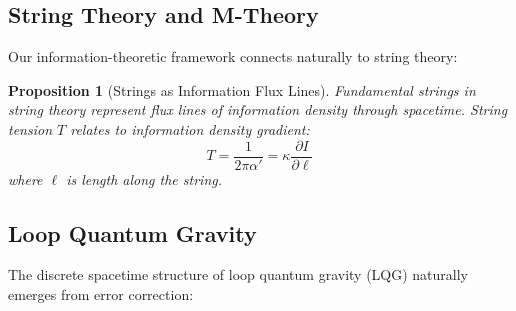 \documentclass[12pt,a4paper]{article}
\newtheorem{proposition}[theorem]{Proposition}
\theoremstyle{remark}
\begin{document}
\subsection{String Theory and M-Theory}

Our information-theoretic framework connects naturally to string theory:

\begin{proposition}[Strings as Information Flux Lines]
Fundamental strings in string theory represent flux lines of information density through spacetime. String tension $T$ relates to information density gradient:
\begin{equation}
T = \frac{1}{2\pi\alpha'} = \kappa\frac{\partial I}{\partial \ell}
\end{equation}
where $\ell$ is length along the string.
\end{proposition}

\subsection{Loop Quantum Gravity}

The discrete spacetime structure of loop quantum gravity (LQG) naturally emerges from error correction:
\end{document}
